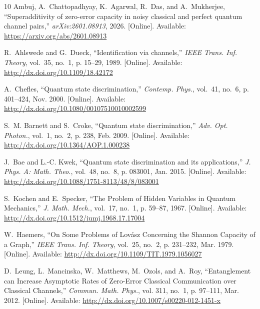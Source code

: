 \documentclass[12pt,a4paper]{article}
\begin{document}
\begin{thebibliography}{10}
\BIBentryALTinterwordspacing
Ambuj, A.~Chattopadhyay, K.~Agarwal, R.~Das, and A.~Mukherjee, ``Superadditivity of zero-error capacity in noisy classical and perfect quantum channel pairs,'' \emph{arXiv:2601.08913}, 2026. [Online]. Available: \url{https://arxiv.org/abs/2601.08913}
\BIBentrySTDinterwordspacing

\BIBentryALTinterwordspacing
R.~Ahlswede and G.~Dueck, ``Identification via channels,'' \emph{IEEE Trans. Inf. Theory}, vol.~35, no.~1, p. 15–29, 1989. [Online]. Available: \url{http://dx.doi.org/10.1109/18.42172}
\BIBentrySTDinterwordspacing

\BIBentryALTinterwordspacing
A.~Chefles, ``Quantum state discrimination,'' \emph{Contemp. Phys.}, vol.~41, no.~6, p. 401–424, Nov. 2000. [Online]. Available: \url{http://dx.doi.org/10.1080/00107510010002599}
\BIBentrySTDinterwordspacing

\BIBentryALTinterwordspacing
S.~M. Barnett and S.~Croke, ``Quantum state discrimination,'' \emph{Adv. Opt. Photon.}, vol.~1, no.~2, p. 238, Feb. 2009. [Online]. Available: \url{http://dx.doi.org/10.1364/AOP.1.000238}
\BIBentrySTDinterwordspacing

\BIBentryALTinterwordspacing
J.~Bae and L.-C. Kwek, ``Quantum state discrimination and its applications,'' \emph{J. Phys. A: Math. Theo.}, vol.~48, no.~8, p. 083001, Jan. 2015. [Online]. Available: \url{http://dx.doi.org/10.1088/1751-8113/48/8/083001}
\BIBentrySTDinterwordspacing

\BIBentryALTinterwordspacing
S.~Kochen and E.~Specker, ``The {P}roblem of {H}idden {V}ariables in {Q}uantum {M}echanics,'' \emph{J. Math. Mech.}, vol.~17, no.~1, p. 59–87, 1967. [Online]. Available: \url{http://dx.doi.org/10.1512/iumj.1968.17.17004}
\BIBentrySTDinterwordspacing

\BIBentryALTinterwordspacing
W.~Haemers, ``On {S}ome {P}roblems of {L}ovász {C}oncerning the {S}hannon {C}apacity of a {G}raph,'' \emph{IEEE Trans. Inf. Theory}, vol.~25, no.~2, p. 231–232, Mar. 1979. [Online]. Available: \url{http://dx.doi.org/10.1109/TIT.1979.1056027}
\BIBentrySTDinterwordspacing

\BIBentryALTinterwordspacing
D.~Leung, L.~Mancinska, W.~Matthews, M.~Ozols, and A.~Roy, ``Entanglement can {I}ncrease {A}symptotic {R}ates of {Z}ero-{E}rror {C}lassical {C}ommunication over {C}lassical {C}hannels,'' \emph{Commun. Math. Phys.}, vol. 311, no.~1, p. 97–111, Mar. 2012. [Online]. Available: \url{http://dx.doi.org/10.1007/s00220-012-1451-x}
\BIBentrySTDinterwordspacing


\end{thebibliography}
\end{document}
